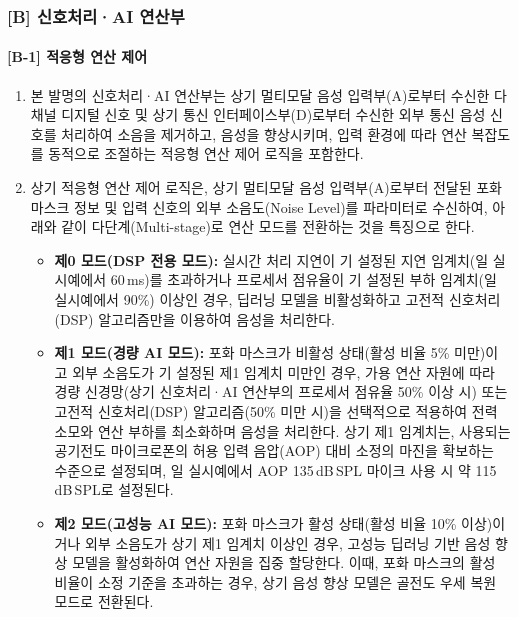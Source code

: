\documentclass{article}
\begin{document}
\subsubsection{[B] 신호처리·AI 연산부}

\paragraph{[B-1] 적응형 연산 제어}

\begin{enumerate}[label = \textbf{(B.1.\arabic*)}]

    \item 본 발명의 신호처리·AI 연산부는 상기 멀티모달 음성 입력부(A)로부터 수신한 다채널 디지털 신호 및 상기 통신 인터페이스부(D)로부터 수신한 외부 통신 음성 신호를 처리하여 소음을 제거하고, 음성을 향상시키며, 입력 환경에 따라 연산 복잡도를 동적으로 조절하는 적응형 연산 제어 로직을 포함한다.

    \item 상기 적응형 연산 제어 로직은, 상기 멀티모달 음성 입력부(A)로부터 전달된 포화 마스크 정보 및 입력 신호의 외부 소음도(Noise Level)를 파라미터로 수신하여, 아래와 같이 다단계(Multi-stage)로 연산 모드를 전환하는 것을 특징으로 한다.

    \begin{itemize}
        \item \textbf{제0 모드(DSP 전용 모드):} 실시간 처리 지연이 기 설정된 지연 임계치(일 실시예에서 60\,ms)를
        초과하거나 프로세서 점유율이 기 설정된 부하 임계치(일 실시예에서 90\%) 이상인 경우, 딥러닝 모델을
        비활성화하고 고전적 신호처리(DSP) 알고리즘만을 이용하여 음성을
        처리한다.

        \item \textbf{제1 모드(경량 AI 모드):} 포화 마스크가 비활성 상태(활성 비율 5\% 미만)이고
        외부 소음도가 기 설정된 제1 임계치 미만인 경우, 가용 연산 자원에 따라 경량 신경망(상기 신호처리·AI 연산부의 프로세서 점유율 50\% 이상 시) 또는
        고전적 신호처리(DSP) 알고리즘(50\% 미만 시)을 선택적으로 적용하여 전력 소모와 연산 부하를
        최소화하며 음성을 처리한다. 상기 제1 임계치는, 사용되는 공기전도 마이크로폰의 허용 입력 음압(AOP) 대비 소정의 마진을 확보하는 수준으로 설정되며, 일 실시예에서 AOP 135\,dB\,SPL 마이크 사용 시 약 115\,dB\,SPL로 설정된다.

        \item \textbf{제2 모드(고성능 AI 모드):} 포화 마스크가 활성 상태(활성 비율 10\% 이상)이거나 외부 소음도가 상기 제1 임계치 이상인 경우, 고성능 딥러닝 기반 음성 향상 모델을 활성화하여 연산 자원을 집중 할당한다. 이때, 포화 마스크의 활성 비율이 소정 기준을 초과하는 경우, 상기 음성 향상 모델은 골전도 우세 복원 모드로 전환된다.
    \end{itemize}


\end{enumerate}
\end{document}
